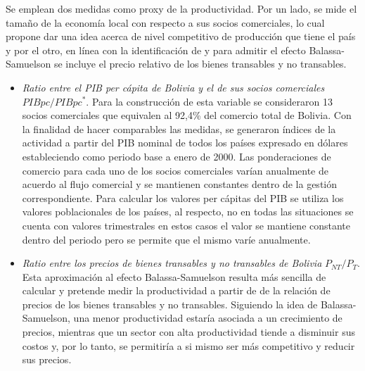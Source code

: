 \documentclass[12pt,letterpaper]{article}
\begin{document}
Se emplean dos medidas como proxy de la productividad. Por un lado, se mide el tamaño de la economía local con respecto a sus socios comerciales, lo cual propone dar una idea acerca de nivel competitivo de producción que tiene el país y por el otro, en línea con la identificación de \cite{clark1999exchange} y para admitir el efecto Balassa-Samuelson se incluye el precio relativo de los bienes transables y no transables.
\begin{itemize}
\item \emph{Ratio entre el PIB per cápita de Bolivia y el de sus socios comerciales} $PIBpc/PIBpc^*$. Para la construcción de esta variable se consideraron 13 socios comerciales que equivalen al 92,4\% del comercio total de Bolivia. Con la finalidad de hacer comparables las medidas, se generaron índices de la actividad a partir del PIB nominal de todos los países expresado en dólares estableciendo como periodo base a enero de 2000. Las ponderaciones de comercio para cada uno de los socios comerciales varían anualmente de acuerdo al flujo comercial y se mantienen constantes dentro de la gestión correspondiente. Para calcular los valores per cápitas del PIB se utiliza los valores poblacionales de los países, al respecto, no en todas las situaciones se cuenta con valores trimestrales en estos casos el valor se mantiene constante dentro del periodo pero se permite que el mismo varíe anualmente. 
\item \emph{Ratio entre los precios de bienes transables y no transables de Bolivia} $P_{NT}/P_T$. Esta aproximación al efecto Balassa-Samuelson resulta más sencilla de calcular y pretende medir la productividad a partir de de la relación de precios de los bienes transables y no transables. Siguiendo la idea de Balassa-Samuelson, una menor productividad estaría asociada a un crecimiento de precios, mientras que un sector con alta productividad tiende a disminuir sus costos y, por lo tanto, se permitiría a si mismo ser más competitivo y reducir sus precios. 
\end{itemize}
\end{document}

